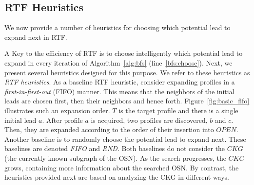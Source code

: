 \documentclass[prodmode,acmtecs]{acmsmall} %
\newcommand{\note}[2]{\textbf{\textsc{#1} says: \textit{#2}}}
\begin{document}


\subsection{RTF Heuristics}

We now provide a number of heuristics for choosing which potential lead to expand next in RTF. 

A Key to the efficiency of RTF is to choose intelligently which potential lead to expand in every iteration of Algorithm~\ref{alg:bfs} (line~\ref{bfs:choose}). Next, we present several heuristics designed for this purpose. We refer to these heuristics as {\em RTF heuristics}. As a baseline RTF heuristic, consider expanding profiles in a {\em first-in-first-out} (FIFO) manner. This means that the neighbors of the initial leads are chosen first, then their neighbors and hence forth. 
Figure~\ref{fig:basic_fifo} illustrates such an expansion order. $T$ is the target profile and there is a single initial lead $a$. After profile $a$ is acquired, two profiles are discovered, $b$ and $c$. Then, they are expanded according to the order of their insertion into $OPEN$.
Another baseline is to randomly choose the potential lead to expand next. 
These baselines are denoted {\em FIFO} and {\em RND}. Both baselines do not consider the $CKG$ (the currently known subgraph of the OSN). As the search progresses, the $CKG$ grows, containing more information about the searched OSN. By contrast, the heuristics provided next are based on analyzing the CKG in different ways.
 
\end{document}
